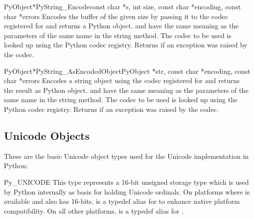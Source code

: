 \begin{cfuncdesc}{PyObject*}{PyString_Encode}{const char *s,
                                               int size,
                                               const char *encoding,
                                               const char *errors}
  Encodes the  buffer of the given size by passing it to
  the codec registered for  and returns a Python object.
   and  have the same meaning as the
  parameters of the same name in the string  method.
  The codec to be used is looked up using the Python codec
  registry.  Returns \NULL{} if an exception was raised by the
  codec.
\end{cfuncdesc}

\begin{cfuncdesc}{PyObject*}{PyString_AsEncodedObject}{PyObject *str,
                                               const char *encoding,
                                               const char *errors}
  Encodes a string object using the codec registered for
   and returns the result as Python object.
   and  have the same meaning as the
  parameters of the same name in the string  method.
  The codec to be used is looked up using the Python codec registry.
  Returns \NULL{} if an exception was raised by the codec.
\end{cfuncdesc}


\subsection{Unicode Objects \label{unicodeObjects}}


These are the basic Unicode object types used for the Unicode
implementation in Python:

\begin{ctypedesc}{Py_UNICODE}
  This type represents a 16-bit unsigned storage type which is used by
  Python internally as basis for holding Unicode ordinals.  On
  platforms where  is available and also has 16-bits,
   is a typedef alias for  to enhance
  native platform compatibility.  On all other platforms,
   is a typedef alias for .
\end{ctypedesc}

